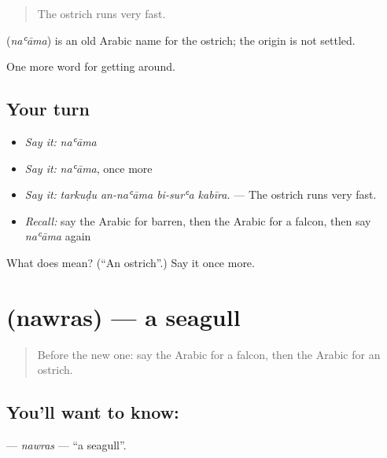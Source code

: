 \begin{quote}
The ostrich runs very fast.
\end{quote}

\begin{cousinweb}
\textbf{} (\emph{naʿāma}) is an old Arabic name for the ostrich; the origin is not settled.
\end{cousinweb}

\begin{grammarlens}[title={What you've built}]
One more word for getting around.
\end{grammarlens}

\subsection*{Your turn}
\begin{itemize}
\raggedright
  \item \emph{Say it:} \emph{naʿāma}
  \item \emph{Say it:} \emph{naʿāma}, once more
  \item \emph{Say it:} \emph{tarkuḍu an-naʿāma bi-surʿa kabīra.} — The ostrich runs very fast.
  \item \emph{Recall:} say the Arabic for barren, then the Arabic for a falcon, then say \emph{naʿāma} again
\end{itemize}

\begin{tcolorbox}[breakable,colback=teal!4,colframe=teal!35!black,title={Before you move on}]
What does  mean? (\textquotedblleft{}An ostrich\textquotedblright{}.) Say it once more.
\end{tcolorbox}
\section[\texorpdfstring{\ar{نورس} (nawras)}{نورس (nawras)}]{ (nawras) — a seagull}

\label{lesson:AR-C474-nawras}



\begin{quote}
Before the new one: say the Arabic for a falcon, then the Arabic for an ostrich.
\end{quote}

\subsection*{You'll want to know: }
\textbf{} — \emph{nawras} — \textquotedblleft{}a seagull\textquotedblright{}.

